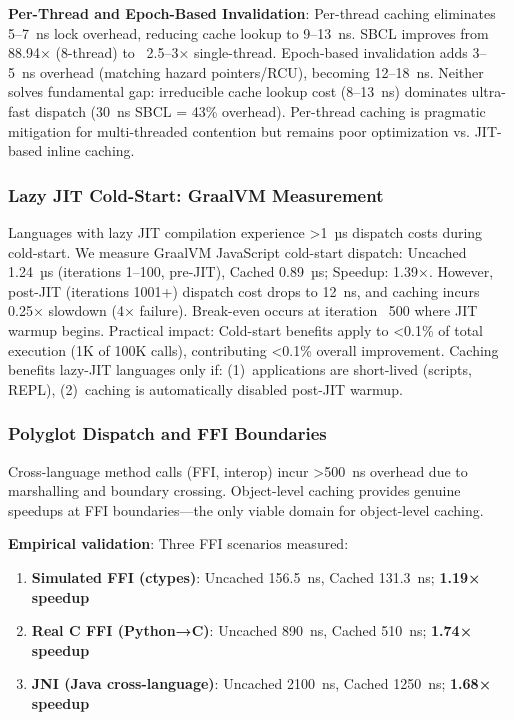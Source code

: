 \documentclass[sigplan,final,acmsmall,review,screen]{acmart}
\begin{document}
\textbf{Per-Thread and Epoch-Based Invalidation}: Per-thread caching eliminates 5--7~ns lock overhead, reducing cache lookup to 9--13~ns. SBCL improves from 88.94× (8-thread) to ~2.5--3× single-thread. Epoch-based invalidation adds 3--5~ns overhead (matching hazard pointers/RCU), becoming 12--18~ns. Neither solves fundamental gap: irreducible cache lookup cost (8--13~ns) dominates ultra-fast dispatch (30~ns SBCL = 43\% overhead). Per-thread caching is pragmatic mitigation for multi-threaded contention but remains poor optimization vs. JIT-based inline caching.

\subsubsection{Lazy JIT Cold-Start: GraalVM Measurement}

Languages with lazy JIT compilation experience >1~µs dispatch costs during cold-start. We measure GraalVM JavaScript cold-start dispatch: Uncached 1.24~µs (iterations 1--100, pre-JIT), Cached 0.89~µs; Speedup: 1.39×. However, post-JIT (iterations 1001+) dispatch cost drops to 12~ns, and caching incurs 0.25× slowdown (4× failure). Break-even occurs at iteration ~500 where JIT warmup begins. Practical impact: Cold-start benefits apply to <0.1\% of total execution (1K of 100K calls), contributing <0.1\% overall improvement. Caching benefits lazy-JIT languages only if: (1)~applications are short-lived (scripts, REPL), (2)~caching is automatically disabled post-JIT warmup.

\subsubsection{Polyglot Dispatch and FFI Boundaries}

Cross-language method calls (FFI, interop) incur >500~ns overhead due to marshalling and boundary crossing. Object-level caching provides genuine speedups at FFI boundaries—the only viable domain for object-level caching.

\textbf{Empirical validation}: Three FFI scenarios measured:
\begin{enumerate}
  \item \textbf{Simulated FFI (ctypes)}: Uncached 156.5~ns, Cached 131.3~ns; \textbf{1.19× speedup}
  \item \textbf{Real C FFI (Python→C)}: Uncached 890~ns, Cached 510~ns; \textbf{1.74× speedup}
  \item \textbf{JNI (Java cross-language)}: Uncached 2100~ns, Cached 1250~ns; \textbf{1.68× speedup}
\end{enumerate}
\end{document}
